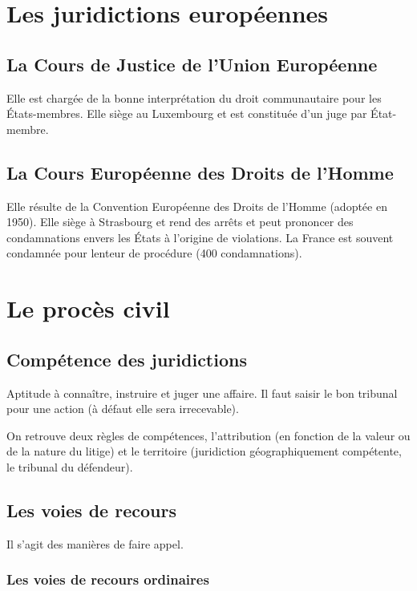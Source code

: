 \documentclass[10pt,a4paper]{article}
\begin{document}
\section{Les juridictions européennes}

\subsection{La Cours de Justice de l'Union Européenne}

Elle est chargée de la bonne interprétation du droit communautaire pour les États-membres. Elle siège au Luxembourg et est constituée d'un juge par État-membre.

\subsection{La Cours Européenne des Droits de l'Homme}

Elle résulte de la Convention Européenne des Droits de l'Homme (adoptée en 1950). Elle siège à Strasbourg et rend des arrêts et peut prononcer des condamnations envers les États à l'origine de violations. La France est souvent condamnée pour lenteur de procédure (400 condamnations).

\section{Le procès civil}

\subsection{Compétence des juridictions}

Aptitude à connaître, instruire et juger une affaire. Il faut saisir le bon tribunal pour une action (à défaut elle sera irrecevable).

On retrouve deux règles de compétences, l'attribution (en fonction de la valeur ou de la nature du litige) et le territoire (juridiction géographiquement compétente, le tribunal du défendeur).

\subsection{Les voies de recours}

Il s'agit des manières de faire appel.

\subsubsection{Les voies de recours ordinaires}
\end{document}
